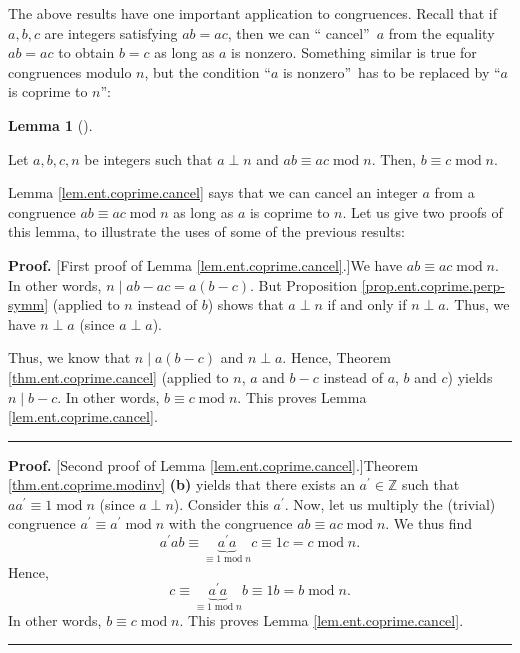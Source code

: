 \documentclass[numbers=enddot,12pt,final,onecolumn,notitlepage]{scrartcl}%
\numberwithin{exer}{subsection}
\theoremstyle{definition}
\newtheorem{lem}[theo]{Lemma}
\newenvironment{lemma}[1][]
{\begin{lem}[#1]\begin{leftbar}}
{\end{leftbar}\end{lem}}
\newenvironment{proof}[1][Proof]{\noindent\textbf{#1.} }{\ \rule{0.5em}{0.5em}}
\begin{document}
The above results have one important application to congruences. Recall that
if $a,b,c$ are integers satisfying $ab=ac$, then we can \textquotedblleft
cancel\textquotedblright\ $a$ from the equality $ab=ac$ to obtain $b=c$ as
long as $a$ is nonzero. Something similar is true for congruences modulo $n$,
but the condition \textquotedblleft$a$ is nonzero\textquotedblright\ has to be
replaced by \textquotedblleft$a$ is coprime to $n$\textquotedblright:

\begin{lemma}
\label{lem.ent.coprime.cancel}Let $a,b,c,n$ be integers such that $a\perp n$
and $ab\equiv ac\operatorname{mod}n$. Then, $b\equiv c\operatorname{mod}n$.
\end{lemma}

Lemma \ref{lem.ent.coprime.cancel} says that we can cancel an integer $a$ from
a congruence $ab\equiv ac\operatorname{mod}n$ as long as $a$ is coprime to
$n$. Let us give two proofs of this lemma, to illustrate the uses of some of
the previous results:

\begin{proof}
[First proof of Lemma \ref{lem.ent.coprime.cancel}.]We have $ab\equiv
ac\operatorname{mod}n$. In other words, $n\mid ab-ac=a\left(  b-c\right)  $.
But Proposition \ref{prop.ent.coprime.perp-symm} (applied to $n$ instead of
$b$) shows that $a\perp n$ if and only if $n\perp a$. Thus, we have $n\perp a$
(since $a\perp a$).

Thus, we know that $n\mid a\left(  b-c\right)  $ and $n\perp a$. Hence,
Theorem \ref{thm.ent.coprime.cancel} (applied to $n$, $a$ and $b-c$ instead of
$a$, $b$ and $c$) yields $n\mid b-c$. In other words, $b\equiv
c\operatorname{mod}n$. This proves Lemma \ref{lem.ent.coprime.cancel}.
\end{proof}

\begin{proof}
[Second proof of Lemma \ref{lem.ent.coprime.cancel}.]Theorem
\ref{thm.ent.coprime.modinv} \textbf{(b)} yields that there exists an
$a^{\prime}\in\mathbb{Z}$ such that $aa^{\prime}\equiv1\operatorname{mod}n$
(since $a\perp n$). Consider this $a^{\prime}$. Now, let us multiply the
(trivial) congruence $a^{\prime}\equiv a^{\prime}\operatorname{mod}n$ with the
congruence $ab\equiv ac\operatorname{mod}n$. We thus find%
\[
a^{\prime}ab\equiv\underbrace{a^{\prime}a}_{\equiv1\operatorname{mod}n}%
c\equiv1c=c\operatorname{mod}n.
\]
Hence,
\[
c\equiv\underbrace{a^{\prime}a}_{\equiv1\operatorname{mod}n}b\equiv
1b=b\operatorname{mod}n.
\]
In other words, $b\equiv c\operatorname{mod}n$. This proves Lemma
\ref{lem.ent.coprime.cancel}.
\end{proof}
\end{document}

